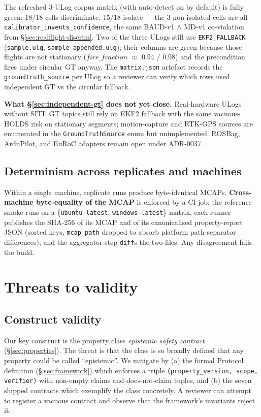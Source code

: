 \documentclass[acmsmall,nonacm=true,review=false]{acmart}
\theoremstyle{plain}
\begin{document}
The refreshed 3-ULog corpus matrix (with auto-detect on by
default) is fully green: 18/18 cells discriminate. 15/18 isolate
--- the 3 non-isolated cells are all
\texttt{calibrator\_invents\_confidence}, the same BAUD-v1 $\wedge$
MD-v1 co-violation from \S\ref{sec:realflight-discrim}. Two of
the three ULogs still use \texttt{EKF2\_FALLBACK}
(\texttt{sample.ulg}, \texttt{sample\_appended.ulg}); their
columns are green because those flights are not stationary
($\mathit{fire\_fraction}$ $\approx$ 0.94 / 0.98) and the
precondition fires under circular GT anyway. The
\texttt{matrix.json} artefact records the
\texttt{groundtruth\_source} per ULog so a reviewer can verify
which rows used independent GT vs the circular fallback.

\textbf{What \S\ref{sec:independent-gt} does not yet close.}
Real-hardware ULogs without SITL GT topics still rely on EKF2
fallback with the same vacuous-HOLDS risk on stationary
segments; motion-capture and RTK-GPS sources are enumerated in
the \texttt{GroundTruthSource} enum but unimplemented. ROSBag,
ArduPilot, and EuRoC adapters remain open under ADR-0037.

\subsection{Determinism across replicates and machines}
Within a single machine, replicate runs produce byte-identical
MCAPs. \textbf{Cross-machine byte-equality of the MCAP} is enforced
by a CI job: the reference smoke runs on a \{\texttt{ubuntu-latest},
\texttt{windows-latest}\} matrix, each runner publishes the SHA-256
of its MCAP and of its canonicalised property-report JSON (sorted
keys, \texttt{mcap\_path} dropped to absorb platform path-separator
differences), and the aggregator step \texttt{diff}s the two files.
Any disagreement fails the build.

\section{Threats to validity}

\subsection{Construct validity}

Our key construct is the property class \emph{epistemic safety
contract} (\S\ref{sec:properties}). The threat is that the
class is so broadly defined that any property could be called
``epistemic''. We mitigate by (a) the formal Protocol
definition (\S\ref{sec:framework}) which enforces a triple
\texttt{(property\_version, scope, verifier)} with non-empty
claims and does-not-claim tuples, and (b) the seven shipped
contracts which exemplify the class concretely. A reviewer can
attempt to register a vacuous contract and observe that the
framework's invariants reject it.
\end{document}

